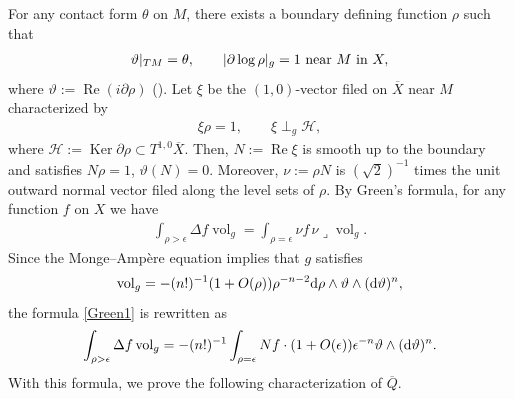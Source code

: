 \documentclass[10pt,a4paper]{amsart}
\numberwithin{equation}{section}
\begin{document}
For any contact form $\theta$ on $M$, there exists a boundary def\/ining function $\rho$ such that
\begin{gather}\label{bdf}
\vartheta|_{TM}=\theta, \qquad |\partial\log\rho|_g=1\ {\rm near}\ M\ {\rm in}\ X,
\end{gather}
where $\vartheta:=\operatorname{Re} (i\partial\rho)$ (\cite[Lemma 3.1]{Seshadri}). Let $\xi$ be the $(1, 0)$-vector f\/iled on $\overline X$ near $M$ characterized by
\begin{gather*}
\xi\rho=1, \qquad \xi\perp_g \mathcal{H},
\end{gather*}
where $\mathcal{H}:=\operatorname{Ker}\partial \rho\subset T^{1,0}\overline X$. Then, $N:=\operatorname{Re}\xi$ is smooth up to the boundary and satisf\/ies $N\rho=1$, $\vartheta(N)=0$. Moreover,
$\nu:=\rho N$ is $(\sqrt 2)^{-1}$ times the unit outward normal vector f\/iled along the level sets of $\rho$. By Green's formula, for any function $f$ on $X$ we have
\begin{gather}\label{Green1}
\int_{\rho>\epsilon} \Delta f\operatorname{vol}_g= \int_{\rho=\epsilon} \nu f\, \nu\lrcorner\operatorname{vol}_g.
\end{gather}
Since the Monge--Amp\`ere equation implies that $g$ satisf\/ies
\begin{gather*}
\operatorname{vol}_g=-(n!)^{-1}(1+O(\rho))\rho^{-n-2}{\rm d}\rho\wedge\vartheta\wedge({\rm d}\vartheta)^n,
\end{gather*}
the formula \eqref{Green1} is rewritten as
\begin{gather}\label{Green2}
\int_{\rho>\epsilon} \Delta f\operatorname{vol}_g=-(n!)^{-1}\int_{\rho=\epsilon} N f\cdot(1+O(\epsilon))\epsilon^{-n} \vartheta\wedge ({\rm d}\vartheta)^n.
\end{gather}
With this formula, we prove the following characterization of $\overline Q$.
\end{document}
